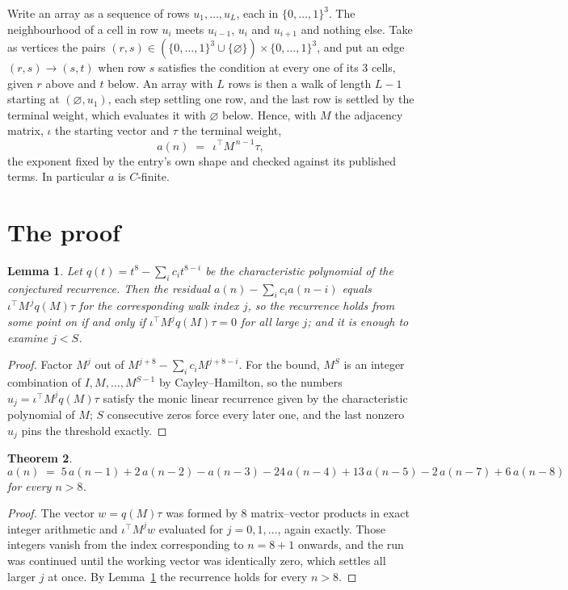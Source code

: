 \documentclass[11pt,a4paper]{article}
\theoremstyle{plain}
\newtheorem{theorem}{Theorem}
\newtheorem{lemma}[theorem]{Lemma}
\theoremstyle{definition}
\begin{document}
Write an array as a sequence of rows $u_1,\dots,u_L$, each in
$\{0,\dots,1\}^{3}$. The neighbourhood of a cell in row $u_i$ meets $u_{i-1}$,
$u_i$ and $u_{i+1}$ and nothing else. Take as vertices the pairs
$(r,s)\in(\{0,\dots,1\}^{3}\cup\{\varnothing\})\times\{0,\dots,1\}^{3}$,
and put an edge $(r,s)\to(s,t)$ when row $s$ satisfies the condition at every one of its
$3$ cells, given $r$ above and $t$ below. An array with $L$ rows is then a walk of length
$L-1$ starting at $(\varnothing,u_1)$, each step settling one row, and the last row is
settled by the terminal weight, which evaluates it with $\varnothing$ below. Hence,
with $M$ the adjacency matrix, $\iota$ the starting vector and $\tau$ the terminal weight,
\[
a(n)\;=\;\,\iota^{\!\top}M^{\,n-1}\tau ,
\]
the exponent fixed by the entry's own shape and checked against its published terms. In
particular $a$ is $C$-finite.

\section{The proof}

\begin{lemma}\label{lem:crit}
Let $q(t)=t^{8}-\sum_i c_it^{8-i}$ be the characteristic polynomial of the
conjectured recurrence. Then the residual $a(n)-\sum_ic_ia(n-i)$ equals
$\iota^{\!\top}M^{\,j}q(M)\tau$ for the corresponding walk index $j$, so the
recurrence holds from some point on if and only if $\iota^{\!\top}M^{j}q(M)\tau=0$ for all
large $j$; and it is enough to examine $j<S$.
\end{lemma}

\begin{proof}
Factor $M^{j}$ out of $M^{j+8}-\sum_ic_iM^{j+8-i}$. For the bound, $M^{S}$
is an integer combination of $I,M,\dots,M^{S-1}$ by Cayley--Hamilton, so the numbers
$u_j=\iota^{\!\top}M^{j}q(M)\tau$ satisfy the monic linear recurrence given by the
characteristic polynomial of $M$; $S$ consecutive zeros force every later one, and the last
nonzero $u_j$ pins the threshold exactly.
\end{proof}

\begin{theorem}
\[
a(n)\;=\;5\,a(n-1) + 2\,a(n-2) - a(n-3) - 24\,a(n-4) + 13\,a(n-5) - 2\,a(n-7) + 6\,a(n-8)
\]
for every $n>8$.
\end{theorem}

\begin{proof}
The vector $w=q(M)\tau$ was formed by $8$ matrix--vector products in exact integer
arithmetic and $\iota^{\!\top}M^{j}w$ evaluated for $j=0,1,\dots$, again exactly. Those
integers vanish from the index corresponding to $n=8+1$ onwards, and the run was
continued until the working vector was identically zero, which settles all larger $j$ at once.
By Lemma~\ref{lem:crit} the recurrence holds for every $n>8$.
\end{proof}
\end{document}
